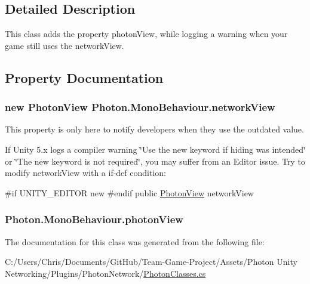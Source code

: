 \subsection{Detailed Description}
This class adds the property photon\+View, while logging a warning when your game still uses the network\+View. 



\subsection{Property Documentation}
\subsubsection[{\texorpdfstring{network\+View}{networkView}}]{\setlength{\rightskip}{0pt plus 5cm}new {\bf Photon\+View} Photon.\+Mono\+Behaviour.\+network\+View\hspace{0.3cm}{\ttfamily [get]}}\hypertarget{class_photon_1_1_mono_behaviour_a00c97185c3a8594bf5c1c518a701706e}{}\label{class_photon_1_1_mono_behaviour_a00c97185c3a8594bf5c1c518a701706e}


This property is only here to notify developers when they use the outdated value. 

If Unity 5.\+x logs a compiler warning \char`\"{}\+Use the new keyword if hiding was intended\char`\"{} or \char`\"{}\+The new keyword is not required\char`\"{}, you may suffer from an Editor issue. Try to modify network\+View with a if-\/def condition\+:

\#if U\+N\+I\+T\+Y\+\_\+\+E\+D\+I\+T\+OR new \#endif public \hyperlink{class_photon_view}{Photon\+View} network\+View 
\subsubsection[{\texorpdfstring{photon\+View}{photonView}}]{ Photon.\+Mono\+Behaviour.\+photon\+View\hspace{0.3cm}{\ttfamily [get]}}\hypertarget{class_photon_1_1_mono_behaviour_a27027ef7d8204896cb9381a200953892}{}\label{class_photon_1_1_mono_behaviour_a27027ef7d8204896cb9381a200953892}


The documentation for this class was generated from the following file\+:\begin{DoxyCompactItemize}
\item 
C\+:/\+Users/\+Chris/\+Documents/\+Git\+Hub/\+Team-\/\+Game-\/\+Project/\+Assets/\+Photon Unity Networking/\+Plugins/\+Photon\+Network/\hyperlink{_photon_classes_8cs}{Photon\+Classes.\+cs}\end{DoxyCompactItemize}

